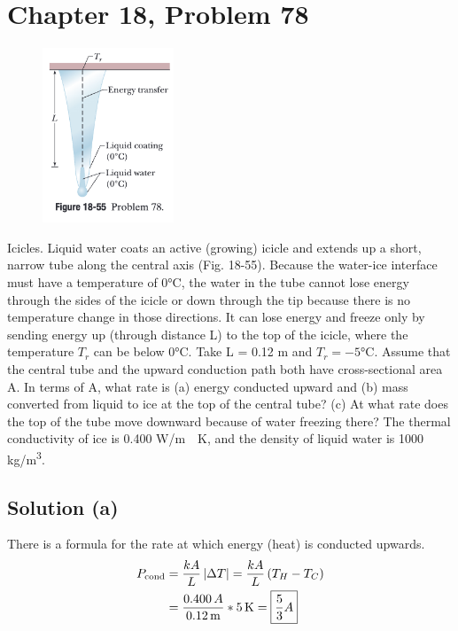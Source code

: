\documentclass{article}
\begin{document}
    \section{Chapter 18, Problem 78}
        \begin{figure}
            \vspace{-50pt}
            \includegraphics[width=0.35\textwidth]{picture_18-55.png} 
        \end{figure}
        Icicles. Liquid water coats an active (growing) icicle and extends up a short, narrow tube along the central axis (Fig. 18-55). 
        Because the water-ice interface must have a temperature of 0\unit{\celsius}, the water in the tube cannot lose energy through the sides of the icicle or down through the tip because there is no temperature change in those directions. 
        It can lose energy and freeze only by sending energy up (through distance L) to the top of the icicle, where the temperature $T_r$ can be below 0\unit{\celsius}. 
        Take L = 0.12 m and $T_r = -5\unit{\celsius}$. 
        Assume that the central tube and the upward conduction path both have cross-sectional area A. 
        In terms of A, what rate is (a) energy conducted upward and (b) mass converted from liquid to ice at the top of the central tube? 
        (c) At what rate does the top of the tube move downward because of water freezing there? 
        The thermal conductivity of ice is 0.400 \unit{\watt/\meter\cdot\kelvin}, and the density of liquid water is 1000 \unit{\kilo\gram/\meter^3}.

        \subsection{Solution (a)}
            There is a formula for the rate at which energy (heat) is conducted upwards.
            \begin{align}
                P_{\rm cond}    &=  \frac{kA}{L} \left| \Delta T \right|
                    =   \frac{kA}{L} \left( T_H - T_C \right)\\
                    &=  \frac{0.400\,A}{0.12\,\unit{\meter}} * 5\,\unit{\kelvin}
                    =   \boxed{\frac{5}{3}A}
            \end{align}
\end{document}
